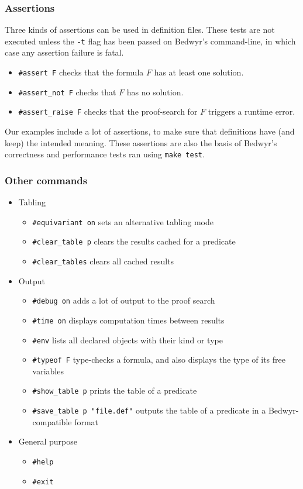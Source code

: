 \subsubsection{Assertions}

Three kinds of assertions can be used in definition files.
These tests are not executed unless the \verb.-t. flag has been passed
on Bedwyr's command-line, in which case any assertion failure is fatal.
\begin{itemize}
\item
\verb.#assert F. checks that the formula $F$ has at least one solution.
\item
\verb.#assert_not F. checks that $F$ has no solution.
\item
\verb.#assert_raise F. checks that the proof-search for $F$ triggers
a runtime error.
\end{itemize}

Our examples include a lot of assertions, to make sure that definitions have
(and keep) the intended meaning. These assertions are also the basis of
Bedwyr's correctness and performance tests ran using \verb.make test..

\subsubsection{Other commands}
\begin{itemize}
  \item Tabling
    \begin{itemize}
      \item \verb.#equivariant on. sets an alternative tabling mode
      \item \verb.#clear_table p. clears the results cached for a
        predicate
      \item \verb.#clear_tables. clears all cached results
    \end{itemize}

  \item Output
    \begin{itemize}
      \item \verb.#debug on. adds a lot of output to the proof search
      \item \verb.#time on. displays computation times between results
      \item \verb.#env. lists all declared objects with their kind or
        type
      \item \verb.#typeof F. type-checks a formula, and also displays
        the type of its free variables
      \item \verb.#show_table p. prints the table of a predicate
      \item \verb+#save_table p "file.def"+ outputs the table of a
        predicate in a Bedwyr-compatible format
    \end{itemize}

  \item General purpose
    \begin{itemize}
      \item \verb.#help.
      \item \verb.#exit.
    \end{itemize}
\end{itemize}


